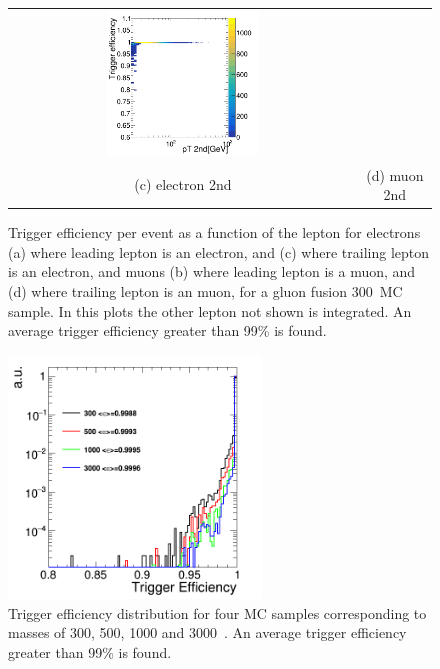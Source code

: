 \begin{figure}[htbp]
\begin{tabular}{cc}
 \includegraphics[width=0.45\textwidth]{../AN/Figs/Trigger/mu2.png} \\
 (c) electron 2nd & (d) muon 2nd \\
\end{tabular}
\caption{
      Trigger efficiency per event
      as a function of the lepton \pt
      for electrons (a) where leading lepton is an electron, 
      and (c) where trailing lepton is an electron, 
      and muons (b) where leading lepton is a muon, 
      and (d) where trailing lepton is an muon, 
      for a gluon fusion 300~\GeV MC sample.
      In this plots the other lepton not shown is
      integrated.
      An average trigger efficiency greater than 99\% is found.      
     }
    \label{Fig:trigger}
\end{figure}
\begin{figure}[htbp]
\centering
 \includegraphics[width=0.6\textwidth]{../AN/Figs/Trigger/triggW.png}
\caption{
      Trigger efficiency distribution for 
      four MC samples corresponding to masses of 300, 500, 1000 and 3000~\GeV.
      An average trigger efficiency greater than 99\% is found.
     }
    \label{Fig:triggerIntegral}
\end{figure}



